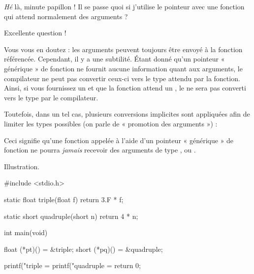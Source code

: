 \begin{questionbox}
  \emph{Hé} là, minute papillon ! Il se
passe quoi si j'utilise le pointeur  avec une fonction qui
attend normalement des arguments ?
\end{questionbox}


Excellente question !

Vous vous en doutez : les arguments peuvent toujours être envoyé à la
fonction référencée. Cependant, il y a une subtilité. Étant donné qu'un
pointeur « générique » de fonction ne fournit aucune information quant
aux arguments, le compilateur ne peut pas convertir ceux-ci vers le type
attendu par la fonction. Ainsi, si vous fournissez un  et
que la fonction attend un , le  ne sera pas
converti vers le type  par le compilateur.

Toutefois, dans un tel cas, plusieurs conversions implicites sont
appliquées afin de limiter les types possibles (on parle de « promotion
des arguments ») :


\begin{erreurbox}
  Ceci signifie qu'une fonction appelée à
l'aide d'un pointeur « générique » de fonction ne pourra \emph{jamais}
recevoir des arguments de type ,  ou
.
\end{erreurbox}


Illustration.

\begin{C}
#include <stdio.h>


static float triple(float f)
{
    return 3.F * f;
}


static short quadruple(short n)
{
    return 4 * n;
}


int main(void)
{
    float (*pt)() = &triple;
    short (*pq)() = &quadruple;

    printf("triple = %
    printf("quadruple = %
    return 0;
}
\end{C}

